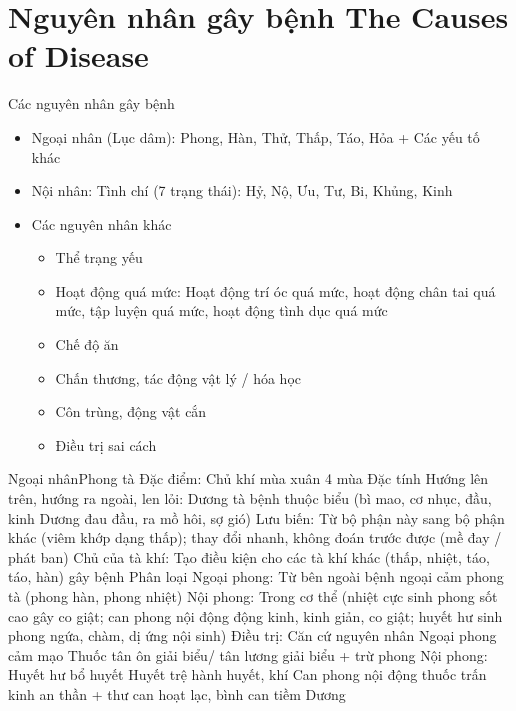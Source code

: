 \documentclass[
	11pt, %
]{beamer}
\theoremstyle{newblock}
\begin{document}
\section{ Nguyên nhân gây bệnh \newline The Causes of Disease}
\begin{frame}{Các nguyên nhân gây bệnh}
	\begin{itemize}
		\item Ngoại nhân (Lục dâm): Phong, Hàn, Thử, Thấp, Táo, Hỏa + Các yếu tố khác
		\item Nội nhân: Tình chí (7 trạng thái): Hỷ, Nộ, Ưu, Tư, Bi, Khủng, Kinh
		\item Các nguyên nhân khác
		\begin{itemize}
			\item Thể trạng yếu
			\item Hoạt động quá mức: Hoạt động trí óc quá mức, hoạt động chân tai quá mức, tập luyện quá mức, hoạt động tình dục quá mức
			\item Chế độ ăn
			\item Chấn thương, tác động vật lý / hóa học
			\item Côn trùng, động vật cắn
			\item Điều trị sai cách
		\end{itemize}

	\end{itemize}
	
\end{frame}
\begin{frame}{Ngoại nhân}{Phong tà}
	Đặc điểm: Chủ khí mùa xuân   4 mùa
Đặc tính
Hướng lên trên, hướng ra ngoài, len lỏi: Dương tà   bệnh thuộc biểu (bì mao, cơ nhục, đầu, kinh Dương   đau đầu, ra mồ hôi, sợ gió)
Lưu biến: Từ bộ phận này sang bộ phận khác (viêm khớp dạng thấp); thay đổi nhanh, không đoán trước được (mề đay / phát ban)
Chủ của tà khí: Tạo điều kiện cho các tà khí khác (thấp, nhiệt, táo, táo, hàn) gây bệnh
Phân loại
Ngoại phong: Từ bên ngoài   bệnh ngoại cảm phong tà (phong hàn, phong nhiệt)
Nội phong: Trong cơ thể (nhiệt cực sinh phong   sốt cao gây co giật; can phong nội động   động kinh, kinh giản, co giật; huyết hư sinh phong   ngứa, chàm, dị ứng nội sinh)
Điều trị: Căn cứ nguyên nhân
Ngoại phong   cảm mạo   Thuốc  tân  ôn  giải  biểu/  tân lương giải biểu + trừ phong
Nội phong:
Huyết hư   bổ huyết
Huyết trệ   hành huyết, khí
Can phong nội động   thuốc trấn kinh an thần + thư can hoạt lạc, bình can tiềm Dương
\end{frame}
\end{document}
